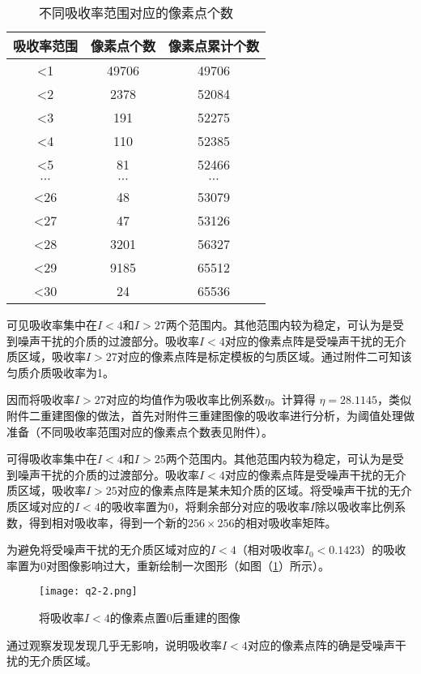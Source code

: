 \documentclass[withoutpreface,bwprint]{cumcmthesis} %
\begin{document}
\begin{table}[!h]
\centering
\caption{不同吸收率范围对应的像素点个数}
\label{不同吸收率范围对应的像素点个数}
\begin{tabular}{ccc}
\toprule
吸收率范围&像素点个数&像素点累计个数\\
\midrule
<1&49706&49706\\
<2&2378&52084\\
<3&191&52275\\
<4&110&52385\\
<5&81&52466\\
$\cdots$ & $\cdots$ & $\cdots$ \\
<26&48&53079\\
<27&47&53126\\
<28&3201&56327\\
<29&9185&65512\\
<30&24&65536\\
\bottomrule 
\end{tabular}
\end{table}

\par 可见吸收率集中在$I<4$和$I>27$两个范围内。其他范围内较为稳定，可认为是受到噪声干扰的介质的过渡部分。吸收率$I<4$对应的像素点阵是受噪声干扰的无介质区域，吸收率$I>27$对应的像素点阵是标定模板的匀质区域。通过附件二可知该匀质介质吸收率为1。

\par 因而将吸收率$I>27$对应的均值作为吸收率比例系数$\eta$。计算得 $\eta=28.1145$，类似附件二重建图像的做法，首先对附件三重建图像的吸收率进行分析，为阈值处理做准备（不同吸收率范围对应的像素点个数表见附件）。

\par 可得吸收率集中在$I<4$和$I>25$两个范围内。其他范围内较为稳定，可认为是受到噪声干扰的介质的过渡部分。吸收率$I<4$对应的像素点阵是受噪声干扰的无介质区域，吸收率$I>25$对应的像素点阵是某未知介质的区域。将受噪声干扰的无介质区域对应的$I<4$的吸收率置为0，将剩余部分对应的吸收率$I$除以吸收率比例系数，得到相对吸收率，得到一个新的$256\times 256$的相对吸收率矩阵。
\par 为避免将受噪声干扰的无介质区域对应的$I<4$（相对吸收率$I_0 < 0.1423$）的吸收率置为$0$对图像影响过大，重新绘制一次图形（如图（\ref{fig:q2-2}）所示）。
\begin{figure}[h]
\small
\centering
\texttt{[image: q2-2.png]}
\caption{将吸收率$I<4$的像素点置0后重建的图像} \label{fig:q2-2}
\end{figure}


\par 通过观察发现发现几乎无影响，说明吸收率$I<4$对应的像素点阵的确是受噪声干扰的无介质区域。
\end{document}

